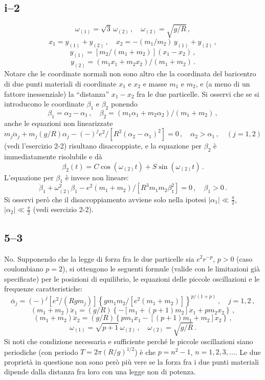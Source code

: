 \documentclass[11pt, a4paper]{book}
\numberwithin{equation}{section}
\begin{document}
\subsection*{i--2}
\[
    \omega_{(1)} = \sqrt{3}\,\omega_{(2)}\,, \quad \omega_{(2)} = \sqrt{g/R} \,,
\]
\[
    x_1 = y_{(1)} + y_{(2)}\,, \quad
    x_2 = -(m_1/m_2)\,y_{(1)} + y_{(2)} \,,
\]
\[
    y_{(1)} = \left[m_2/(m_1+m_2)\right](x_1-x_2) \,,
\]
\[
    y_{(2)} = (m_1 x_1 + m_2 x_2)/(m_1+m_2) \,.
\]
Notare che le coordinate normali non sono altro che la coordinata del baricentro
di due punti materiali di coordinate $x_1$ e $x_2$ e masse $m_1$ e $m_2$, e (a
meno di un fattore inessenziale) la ``distanza'' $x_1-x_2$ fra le due
particelle. Si osservi che se si introducono le coordinate $\beta_1$ e $\beta_2$
ponendo
\[
    \beta_1 = \alpha_2 - \alpha_1\,, \quad
    \beta_2 = (m_1\alpha_1+m_2\alpha_2)/(m_1+m_2) \,,
\]
anche le equazioni non linearizzate
\[
    m_j\ddot{\alpha}_j + m_j(g/R)\alpha_j - (-)^j e^2/[R^2(\alpha_2-\alpha_1)^2]
    = 0\,, \quad \alpha_2>\alpha_1\,, \quad (j=1,2)
\]
(vedi l'esercizio 2-2) risultano disaccoppiate, e la equazione per $\beta_2$ è
immediatamente risolubile e dà
\[
    \beta_2(t) = C\cos(\omega_{(2)}t) + S\sin(\omega_{(2)}t) \,.
\]
L'equazione per $\beta_1$ è invece non lineare:
\[
    \ddot{\beta}_1 + \omega_{(2)}^2\beta_1
    - e^2(m_1+m_2)/[R^3 m_1 m_2\beta_1^2] = 0\,, \quad \beta_1 > 0 \,.
\]
Si osservi però che il disaccoppiamento avviene solo nella ipotesi
$|\alpha_1| \ll \frac{\pi}{2}$, $|\alpha_2| \ll \frac{\pi}{2}$ (vedi esercizio 2-2).

\subsection*{5--3}
No. Supponendo che la legge di forza fra le due particelle sia $e^2 r^{-p}$,
$p>0$ (caso coulombiano $p=2$), si ottengono le seguenti formule (valide con le
limitazioni già specificate) per le posizioni di equilibrio, le equazioni delle
piccole oscillazioni e le frequenze caratteristiche:
\[
    \bar{\alpha}_j = (-)^j \left[e^2/(Rgm_j)\right]
    \left\{gm_1m_2/[e^2(m_1+m_2)]\right\}^{p/(1+p)}\,,
    \quad j=1,2 \,,
\]
\[
    (m_1+m_2)\ddot{x}_1 = (g/R)\left\{-[m_1+(p+1)m_2]x_1 + pm_2 x_2\right\} \,,
\]
\[
    (m_1+m_2)\ddot{x}_2 = (g/R)\left\{pm_1 x_1 - [(p+1)m_1+m_2]x_2\right\} \,,
\]
\[
    \omega_{(1)} = \sqrt{p+1}\,\omega_{(2)}\,, \quad \omega_{(2)} = \sqrt{g/R} \,.
\]
Si noti che condizione necessaria e sufficiente perché le piccole oscillazioni
siano periodiche (con periodo $T = 2\pi(R/g)^{1/2}$) è che $p = n^2-1$,
$n=1,2,3,\ldots$. Le due proprietà in questione non sono però più vere se la
forza fra i due punti materiali dipende dalla distanza fra loro con una legge
non di potenza.
\end{document}
